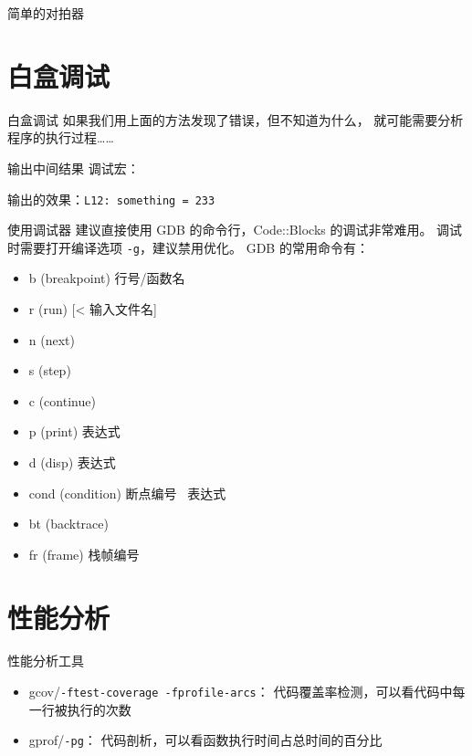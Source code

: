 \documentclass[10pt,mathserif]{beamer}%
\begin{document}
\begin{frame}{简单的对拍器}
	
\end{frame}

\section{白盒调试}
\begin{frame}{白盒调试}
	如果我们用上面的方法发现了错误，但不知道为什么，
	就可能需要分析程序的执行过程……
\end{frame}

\begin{frame}{输出中间结果}
	调试宏：
	
	输出的效果：\lstinline!L12: something = 233!
\end{frame}

\begin{frame}{使用调试器}
	建议直接使用 GDB 的命令行，Code::Blocks 的调试非常难用。
	调试时需要打开编译选项 \lstinline!-g!，建议禁用优化。
	GDB 的常用命令有：
	\begin{itemize}
		\item b (breakpoint) 行号/函数名
		\item r (run) [< 输入文件名]
		\item n (next)
		\item s (step)
		\item c (continue)
		\item p (print) 表达式
		\item d (disp) 表达式
		\item cond (condition) 断点编号 \  表达式
		\item bt (backtrace)
		\item fr (frame) 栈帧编号
	\end{itemize}
\end{frame}

\section{性能分析}
\begin{frame}{性能分析工具}
	\begin{itemize}
		\item gcov/\lstinline|-ftest-coverage -fprofile-arcs|：
			代码覆盖率检测，可以看代码中每一行被执行的次数
		\item gprof/\lstinline|-pg|：
			代码剖析，可以看函数执行时间占总时间的百分比
	\end{itemize}
\end{frame}
\end{document}

